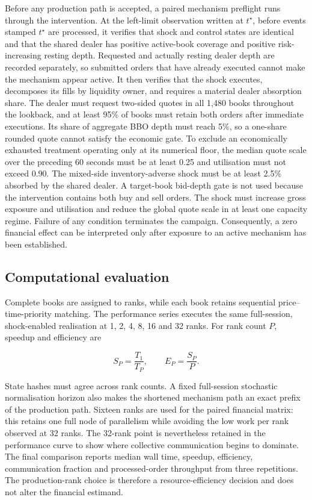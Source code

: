 Before any production path is accepted, a paired mechanism preflight runs
through the intervention.  At the left-limit observation written at
$t^\star$, before events stamped $t^\star$ are processed, it verifies that
shock and control states are identical and that
the shared dealer has positive active-book coverage and positive
risk-increasing resting depth.  Requested and actually resting dealer depth
are recorded separately, so submitted orders that have already executed
cannot make the mechanism appear active. It then verifies that the shock
executes, decomposes its fills by liquidity owner, and requires a material
dealer absorption share. The dealer must request two-sided quotes in all 1,480
books throughout the lookback, and at least 95\% of books must retain both
orders after immediate executions. Its share of aggregate BBO depth must reach
5\%, so a one-share rounded quote cannot satisfy the economic gate. To exclude
an economically exhausted treatment operating only at its numerical floor,
the median quote scale over the preceding 60 seconds must be at least 0.25 and
utilisation must not exceed 0.90. The mixed-side inventory-adverse shock must
be at least 2.5\% absorbed by the shared dealer. A target-book bid-depth gate
is not used because the intervention contains both buy and sell orders. The
shock must increase gross exposure and utilisation and reduce the global quote
scale in at least one capacity regime.
Failure of any condition
terminates the campaign.  Consequently, a zero financial effect can be
interpreted only after exposure to an active mechanism has been established.

\subsection{Computational evaluation}

Complete books are assigned to ranks, while each book retains sequential
price--time-priority matching.  The performance series executes the same
full-session, shock-enabled realisation at 1, 2, 4, 8, 16 and 32 ranks.  For
rank count $P$, speedup and efficiency are

\begin{equation}
  S_P=\frac{T_1}{T_P}, \qquad
  E_P=\frac{S_P}{P}.
\end{equation}

State hashes must agree across rank counts.  A fixed full-session stochastic
normalisation horizon also makes the shortened mechanism path an exact prefix
of the production path.  Sixteen ranks are used for the
paired financial matrix: this retains one full node of parallelism while
avoiding the low work per rank observed at 32 ranks.  The 32-rank point is
nevertheless retained in the performance curve to show where collective
communication begins to dominate.  The final comparison reports median wall
time, speedup, efficiency, communication fraction and processed-order
throughput from three repetitions.  The production-rank choice is therefore a
resource-efficiency decision and does not alter the financial estimand.

